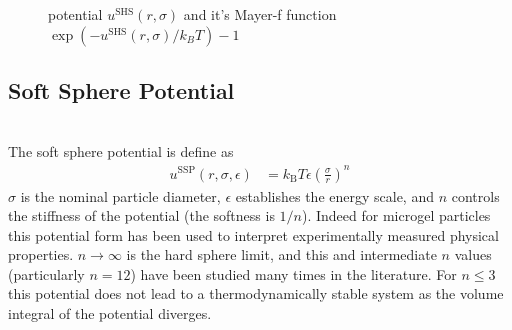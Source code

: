 \begin{figure}[htb]
\centering
  \quad
  \caption{potential $u^\text{SHS}(r,\sigma)$ and it's Mayer-f function $\exp(-u^\text{SHS}(r,\sigma)/k_BT)-1$}
\end{figure}

\clearpage
\subsection{Soft Sphere Potential}
~\\

The soft sphere potential is define as
\begin{align}
u^\text{SSP}(r,\sigma,\epsilon) &=
k_\text{B} T \epsilon \left(\frac{\sigma}{r}\right)^n
\end{align}
$\sigma$ is the nominal particle diameter, $\epsilon$ establishes the
energy scale, and $n$ controls the stiffness of the potential (the
softness is $1/n$). Indeed for microgel particles this potential
form has been used to interpret experimentally measured
physical properties. $n\rightarrow\infty$ is the hard sphere limit, and this
and intermediate $n$ values (particularly $n=12$) have been
studied many times in the literature. For $n\leq 3$
this potential does not lead to a thermodynamically stable
system as the volume integral of the potential diverges.


